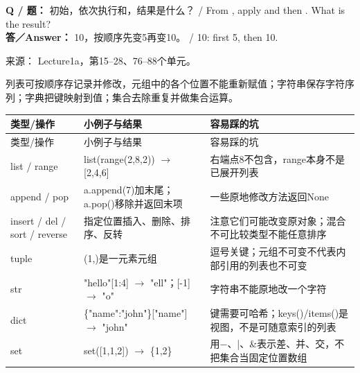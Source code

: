 \textbf{Q / 题：} 初始，依次执行和，结果是什么？ / From , apply  and then . What is the result?\\

\textbf{答／Answer：} 10，按顺序先变5再变10。 / 10: first 5, then 10.


来源： Lecture1a，第15–28、76–88个单元。








列表可按顺序存记录并修改，元组中的各个位置不能重新赋值；字符串保存字符序列；字典把键映射到值；集合去除重复并做集合运算。


\begingroup
\small\setlength{\tabcolsep}{3pt}
\renewcommand{\arraystretch}{1.22}
\begin{longtable}{@{}>{\raggedright\arraybackslash}p{}>{\raggedright\arraybackslash}p{}>{\raggedright\arraybackslash}p{}@{}}
\toprule
类型/操作 & 小例子与结果 & 容易踩的坑 \\
\midrule\endfirsthead
类型/操作 & 小例子与结果 & 容易踩的坑 \\
\midrule\endhead
\bottomrule\endfoot
list / range & list(range(2,8,2)) \ensuremath{\to} [2,4,6] & 右端点8不包含，range本身不是已展开列表 \\
append / pop & a.append(7)加末尾；a.pop()移除并返回末项 & 一些原地修改方法返回None \\
insert / del / sort / reverse & 指定位置插入、删除、排序、反转 & 注意它们可能改变原对象；混合不可比较类型不能任意排序 \\
tuple & (1,)是一元素元组 & 逗号关键；元组不可变不代表内部引用的列表也不可变 \\
str & "hello"[1:4] \ensuremath{\to} "ell"；[-1] \ensuremath{\to} "o" & 字符串不能原地改一个字符 \\
dict & \{"name":"john"\}["name"] \ensuremath{\to} "john" & 键需要可哈希；keys()/items()是视图，不是可随意索引的列表 \\
set & set([1,1,2]) \ensuremath{\to} \{1,2\} & 用\ensuremath{-}、|、\&表示差、并、交，不把集合当固定位置数组 \\
\end{longtable}
\endgroup


